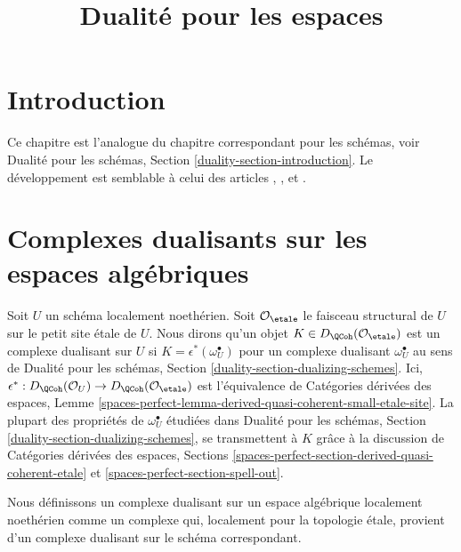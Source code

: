 

%


\title{Dualité pour les espaces}


\maketitle

\label{section-phantom}

\tableofcontents

\section{Introduction}
\label{section-introduction}

\noindent
Ce chapitre est l'analogue du chapitre correspondant pour les
schémas, voir Dualité pour les schémas, Section \ref{duality-section-introduction}.
Le développement est semblable à celui des articles
\cite{Neeman-Grothendieck}, \cite{LN},
\cite{Lipman-notes} et \cite{Neeman-improvement}.




\section{Complexes dualisants sur les espaces algébriques}
\label{section-dualizing-spaces}

\noindent
Soit $U$ un schéma localement noethérien. Soit $\mathcal{O}_\etale$
le faisceau structural de $U$ sur le petit site \'etale de $U$.
Nous dirons qu'un objet $K \in D_\QCoh(\mathcal{O}_\etale)$ est
un complexe dualisant sur $U$ si $K = \epsilon^*(\omega_U^\bullet)$
pour un complexe dualisant $\omega_U^\bullet$ au sens de
Dualité pour les schémas, Section \ref{duality-section-dualizing-schemes}.
Ici, $\epsilon^* : D_\QCoh(\mathcal{O}_U) \to D_\QCoh(\mathcal{O}_\etale)$
est l'équivalence de Catégories dérivées des espaces, Lemme
\ref{spaces-perfect-lemma-derived-quasi-coherent-small-etale-site}.
La plupart des propriétés de $\omega_U^\bullet$ étudiées dans
Dualité pour les schémas, Section \ref{duality-section-dualizing-schemes},
se transmettent à $K$ grâce à la discussion de
Catégories dérivées des espaces, Sections
\ref{spaces-perfect-section-derived-quasi-coherent-etale} et
\ref{spaces-perfect-section-spell-out}.

\medskip\noindent
Nous définissons un complexe dualisant sur un espace algébrique localement noethérien
comme un complexe qui, localement pour la topologie \'etale, provient d'un complexe dualisant
sur le schéma correspondant.


